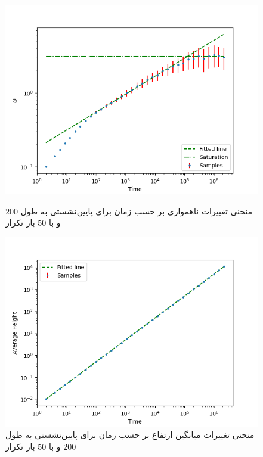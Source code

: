 \documentclass[11pt, a4paper]{article}
\begin{document}
\begin{figure}[h]
	\centering
  \begin{minipage}[b]{0.48\textwidth}
    \includegraphics[width=\textwidth]{q5_200_50_1_15_.4_omega.png}
    \caption{منحنی تغییرات ناهمواری بر حسب زمان برای پایین‌نشستی به طول $200$ و با $50$ بار تکرار}
    \label{fig:q5_200_50_omega}
  \end{minipage}
  \hfill
  \begin{minipage}[b]{0.48\textwidth}
    \includegraphics[width=\textwidth]{q5_200_50_1_15_.4_avg.png}
    \caption{منحنی تغییرات میانگین ارتفاع بر حسب زمان برای پایین‌نشستی به طول $200$ و با $50$ بار تکرار}
    \label{fig:q5_200_50_avg}
  \end{minipage}
\end{figure}
\end{document}
